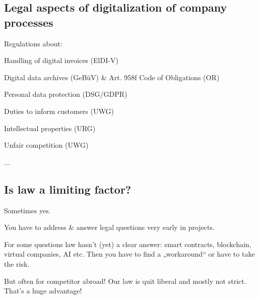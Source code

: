 \subsection{Legal aspects of digitalization of company processes}
Regulations about:
\begin{compactitem}
	\item Handling of digital invoices (ElDI-V)
	\item Digital data archives (GeBüV) \& Art. 958f Code of Obligations (OR)
	\item Personal data protection (DSG/GDPR)
	\item Duties to inform customers (UWG)
	\item Intellectual properties (URG)
	\item Unfair competition (UWG)
	\item ...
\end{compactitem}

\subsection{Is law a limiting factor?}
Sometimes yes.
\begin{compactitem}
	\item You have to address \& answer legal questions very early in projects.
	\item For some questions law hasn’t (yet) a clear answer: smart contracts, blockchain, virtual companies, AI etc. Then you have to find a „workaround“ or have to take the risk.
	\item But often for competitor abroad! Our law is quit liberal and mostly not strict. That’s a huge advantage!
\end{compactitem}
